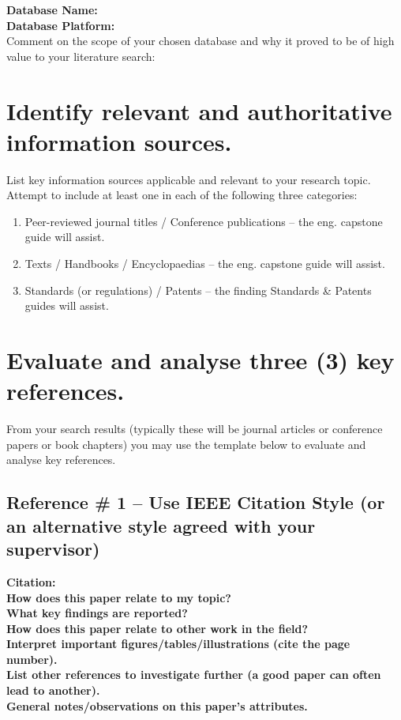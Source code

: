 \documentclass[12pt, a4paper]{article}
\begin{document}
\textbf{Database Name:} \hrulefill \\

\textbf{Database Platform:} \hrulefill \\

Comment on the scope of your chosen database and why it proved to be of high value to your literature search:
\vspace{2cm}

\section*{Identify relevant and authoritative information sources.}
List key information sources applicable and relevant to your research topic. Attempt to include at least one in each of the following three categories:
\begin{enumerate}[label=\alph*.]
    \item Peer-reviewed journal titles / Conference publications – the eng. capstone guide will assist.
    \item Texts / Handbooks / Encyclopaedias – the eng. capstone guide will assist.
    \item Standards (or regulations) / Patents – the finding Standards \& Patents guides will assist.
\end{enumerate}

\section*{Evaluate and analyse three (3) key references.}
From your search results (typically these will be journal articles or conference papers or book chapters) you may use the template below to evaluate and analyse key references.

\subsection*{Reference \# 1 -- Use IEEE Citation Style (or an alternative style agreed with your supervisor)}
\textbf{Citation:} \vspace{1cm} \\
\textbf{How does this paper relate to my topic?} \vspace{1.5cm} \\
\textbf{What key findings are reported?} \vspace{1.5cm} \\
\textbf{How does this paper relate to other work in the field?} \vspace{1.5cm} \\
\textbf{Interpret important figures/tables/illustrations (cite the page number).} \vspace{1.5cm} \\
\textbf{List other references to investigate further (a good paper can often lead to another).} \vspace{1.5cm} \\
\textbf{General notes/observations on this paper’s attributes.} \vspace{1.5cm}
\end{document}
